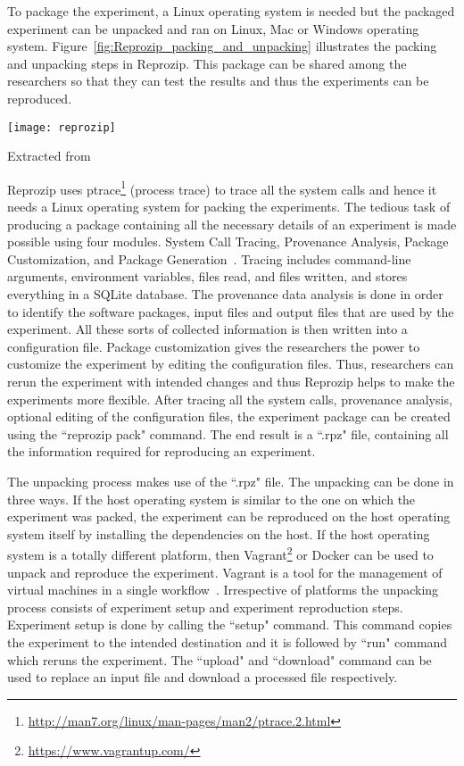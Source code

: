 To package the experiment, a Linux operating system is needed but the packaged experiment can be unpacked and ran on Linux, Mac or Windows operating system. Figure~\ref{fig:Reprozip_packing_and_unpacking} illustrates the packing and unpacking steps in Reprozip. This package can be shared among the researchers so that they can test the results and thus the experiments can be reproduced.

\begin{center}
\texttt{[image: reprozip]}
\label{fig:Reprozip_packing_and_unpacking}
\caption*{Extracted from \cite{Rampin2016}}
\end{center}

Reprozip uses ptrace\footnote{\url{http://man7.org/linux/man-pages/man2/ptrace.2.html}} (process trace) to trace all the system calls and hence it needs a Linux operating system for packing the experiments. The tedious task of producing a package containing all the necessary details of an experiment is made possible using four modules. System Call Tracing, Provenance Analysis, Package Customization, and Package Generation~\cite{Chirigati:2013:RUP:2482613.2482614}. Tracing includes command-line arguments, environment variables, files read, and files written, and stores everything in a SQLite database. The provenance data analysis is done in order to identify the software packages, input files and output files that are used by the experiment. All these sorts of collected information is then written into a configuration file. Package customization gives the researchers the power to customize the experiment by editing the configuration files. Thus, researchers can rerun the experiment with intended changes and thus Reprozip helps to make the experiments more flexible. After tracing all the system calls, provenance analysis, optional editing of the configuration files, the experiment package can be created using the ``reprozip pack" command. The end result is a ``.rpz" file, containing all the information required for reproducing an experiment.

The unpacking process makes use of the ``.rpz" file. The unpacking can be done in three ways. If the host operating system is similar to the one on which the experiment was packed, the experiment can be reproduced on the host operating system itself by installing the dependencies on the host. If the host operating system is a totally different platform, then Vagrant\footnote{\url{https://www.vagrantup.com/}} or Docker can be used to unpack and reproduce the experiment. Vagrant is a tool for the management of virtual machines in a single workflow~\cite{vagrant}. Irrespective of platforms the unpacking process consists of experiment setup and experiment reproduction steps. Experiment setup is done by calling the ``setup" command. This command copies the experiment to the intended destination and it is followed by ``run" command which reruns the experiment. The ``upload" and ``download" command can be used to replace an input file and download a processed file respectively.

